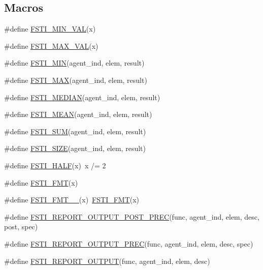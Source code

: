 \subsection*{Macros}
\begin{DoxyCompactItemize}
\item 
\#define \mbox{\hyperlink{fsti-report_8h_abd86f17f25e9c940c74a103963b43a29}{F\+S\+T\+I\+\_\+\+M\+I\+N\+\_\+\+V\+AL}}(x)
\item 
\#define \mbox{\hyperlink{fsti-report_8h_a7a3f630a5d02d8f4d130a45685e3bc79}{F\+S\+T\+I\+\_\+\+M\+A\+X\+\_\+\+V\+AL}}(x)
\item 
\#define \mbox{\hyperlink{fsti-report_8h_a23a8b3ad8faaf4c4f0f645486e27faeb}{F\+S\+T\+I\+\_\+\+M\+IN}}(agent\+\_\+ind,  elem,  result)
\item 
\#define \mbox{\hyperlink{fsti-report_8h_ab932f3ee72d85924f642c9adfce84dc3}{F\+S\+T\+I\+\_\+\+M\+AX}}(agent\+\_\+ind,  elem,  result)
\item 
\#define \mbox{\hyperlink{fsti-report_8h_abecbb06bd9bca39305faadb443899fa9}{F\+S\+T\+I\+\_\+\+M\+E\+D\+I\+AN}}(agent\+\_\+ind,  elem,  result)
\item 
\#define \mbox{\hyperlink{fsti-report_8h_a56c545164f457022ec874321798f99af}{F\+S\+T\+I\+\_\+\+M\+E\+AN}}(agent\+\_\+ind,  elem,  result)
\item 
\#define \mbox{\hyperlink{fsti-report_8h_a5bb9a155a22683696d8123919e84c132}{F\+S\+T\+I\+\_\+\+S\+UM}}(agent\+\_\+ind,  elem,  result)
\item 
\#define \mbox{\hyperlink{fsti-report_8h_a43cc0a51906bd2c2ec0c77a15d50f145}{F\+S\+T\+I\+\_\+\+S\+I\+ZE}}(agent\+\_\+ind,  elem,  result)
\item 
\#define \mbox{\hyperlink{fsti-report_8h_a37590f808a79f88b2369a0f77cb1b47e}{F\+S\+T\+I\+\_\+\+H\+A\+LF}}(x)~x /= 2
\item 
\#define \mbox{\hyperlink{fsti-report_8h_a1d142e2f26d2af3100e4bd1a76aee1d1}{F\+S\+T\+I\+\_\+\+F\+MT}}(x)
\item 
\#define \mbox{\hyperlink{fsti-report_8h_a69fb6754f171ddae0a378657b60f8ae3}{F\+S\+T\+I\+\_\+\+F\+M\+T\+\_\+\+\_\+}}(x)~\mbox{\hyperlink{fsti-report_8h_a1d142e2f26d2af3100e4bd1a76aee1d1}{F\+S\+T\+I\+\_\+\+F\+MT}}(x)
\item 
\#define \mbox{\hyperlink{fsti-report_8h_a257c53cc76bb683bc90f00a972456432}{F\+S\+T\+I\+\_\+\+R\+E\+P\+O\+R\+T\+\_\+\+O\+U\+T\+P\+U\+T\+\_\+\+P\+O\+S\+T\+\_\+\+P\+R\+EC}}(func,  agent\+\_\+ind,  elem,  desc,  post,  spec)
\item 
\#define \mbox{\hyperlink{fsti-report_8h_a40a22c32155c8f01c2a9ed380aec87cb}{F\+S\+T\+I\+\_\+\+R\+E\+P\+O\+R\+T\+\_\+\+O\+U\+T\+P\+U\+T\+\_\+\+P\+R\+EC}}(func,  agent\+\_\+ind,  elem,  desc,  spec)
\item 
\#define \mbox{\hyperlink{fsti-report_8h_a1ca2804ea269ac3530af9dbf5449e443}{F\+S\+T\+I\+\_\+\+R\+E\+P\+O\+R\+T\+\_\+\+O\+U\+T\+P\+UT}}(func,  agent\+\_\+ind,  elem,  desc)
\end{DoxyCompactItemize}
